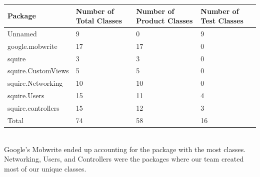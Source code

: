 \documentclass[twoside,letterpaper]{article}
\begin{document}
\begin{tabular}{|p{4cm}|p{3cm}|p{3cm}|p{3cm}|}
\hline
Package                      & Number of Total Classes & Number of Product Classes & Number of Test Classes \\ \hline
Unnamed                     & 9                       & 0                        & 9                      \\ \hline
google.mobwrite              & 17                      & 17                       & 0                      \\ \hline
squire                       & 3                       & 3                        & 0                      \\ \hline
squire.CustomViews           & 5                       & 5                        & 0                      \\ \hline
squire.Networking            & 10                      & 10                       & 0                      \\ \hline
squire.Users                 & 15                      & 11                       & 4                      \\ \hline
squire.controllers           & 15                      & 12                       & 3                      \\ \hline
Total                       & 74                      & 58                       & 16                     \\ \hline
\end{tabular}
\\ \noindent Google's Mobwrite ended up accounting for the package with the most classes. Networking, Users, and Controllers were the packages where our team created most of our unique classes. 
\end{document}
